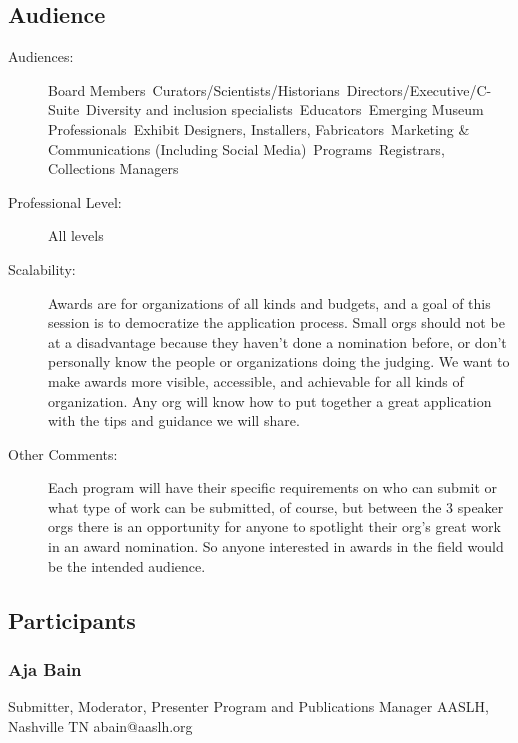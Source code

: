\documentclass{report}
\begin{document}
              \subsection*{Audience}
                \begin{description}
                  \item [Audiences:]Board Members~Curators/Scientists/Historians~Directors/Executive/C-Suite~Diversity and inclusion specialists~Educators~Emerging Museum Professionals~Exhibit Designers, Installers, Fabricators~Marketing \& Communications (Including Social Media)~Programs~Registrars, Collections Managers~
                  \item[Professional Level:]All levels~
                \item[Scalability:] Awards are for organizations of all kinds and budgets, and a goal of this session is to democratize the application process. Small orgs should not be at a disadvantage because they haven't done a nomination before, or don't personally know the people or organizations doing the judging. We want to make awards more visible, accessible, and achievable for all kinds of organization. Any org will know how to put together a great application with the tips and guidance we will share.

							
              \item[Other Comments:] Each program will have their specific requirements on who can submit or what type of work can be submitted, of course, but between the 3 speaker orgs there is an opportunity for anyone to spotlight their org's great work in an award nomination. So anyone interested in awards in the field would be the intended audience.
              \end{description}
            \subsection*{Participants}
              \subsubsection*{ Aja Bain }
              Submitter, Moderator, Presenter\newline
              Program and Publications Manager\newline
              AASLH, Nashville TN
              \newline
              abain@aaslh.org\newline
              
\end{document}
